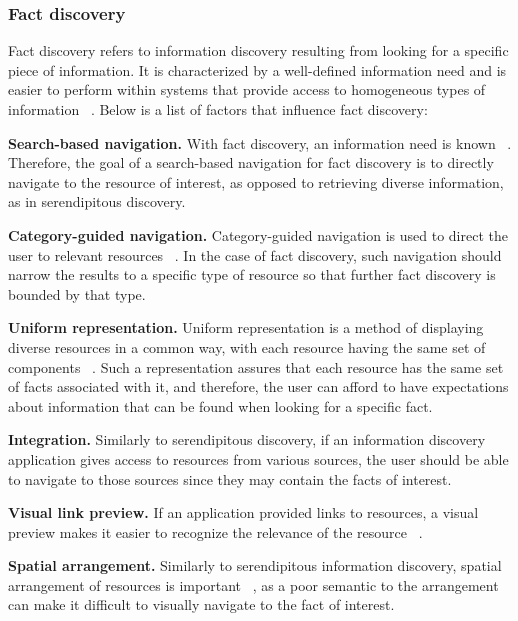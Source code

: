 \documentclass{casconpaper}
\begin{document}
{\subsubsection{Fact discovery}
Fact discovery refers to information discovery resulting from looking for a specific piece of information. It is characterized by a well-defined information need and is easier to perform within systems that provide access to homogeneous types of information ~\cite{kellar2006, lindley}. Below is a list of factors that influence fact discovery: 

\textbf{Search-based navigation.} With fact discovery, an information need is known ~\cite{kellar2006, kellar2007}. Therefore, the goal of a search-based navigation for fact discovery is to directly navigate to the resource of interest, as opposed to retrieving diverse information, as in serendipitous discovery.

\textbf{Category-guided navigation.} Category-guided navigation is used to direct the user to relevant resources ~\cite{levene}. In the case of fact discovery, such navigation should narrow the results to a specific type of resource so that further fact discovery is bounded by that type. 

\textbf{Uniform representation.} Uniform representation is a method of displaying diverse resources in a common way, with each resource having the same set of components ~\cite{herrera}. Such a representation assures that each resource has the same set of facts associated with it, and therefore, the user can afford to have expectations about information that can be found when looking for a specific fact.

\textbf{Integration.} Similarly to serendipitous discovery, if an information discovery application gives access to resources from various sources, the user should be able to navigate to those sources since they may contain the facts of interest.

\textbf{Visual link preview.} If an application provided links to resources, a visual preview makes it easier to recognize the relevance of the resource ~\cite{abrams}. 

\textbf{Spatial arrangement.} Similarly to serendipitous information discovery, spatial arrangement of resources is important ~\cite{abrams}, as a poor semantic to the arrangement can make it difficult to visually navigate to the fact of interest.


} %
\end{document}
